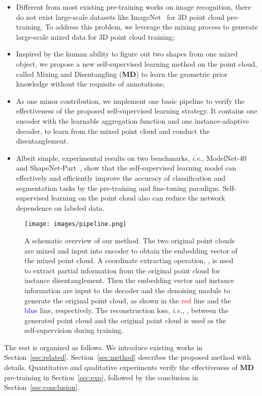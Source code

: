 \documentclass[journal]{IEEEtran}
\def\ie{\emph{i.e.}}
\begin{document}
\begin{itemize}
\item Different from most existing pre-training works on image recognition, there do not exist large-scale datasets like ImageNet~\cite{ILSVRC15} for 3D point cloud pre-training. To address this problem, we leverage the mixing process to generate large-scale mixed data for 3D point cloud training;

\item Inspired by the human ability to figure out two shapes from one mixed object, we propose a new self-supervised learning method on the point cloud, called Mixing and Disentangling (\textbf{MD}) to learn the geometric prior knowledge without the requisite of annotations;

\item As one minor contribution, we implement one basic pipeline to verify the effectiveness of the proposed self-supervised learning strategy. It contains one encoder with the learnable aggregation function and one instance-adaptive decoder, to learn from the mixed point cloud and conduct the disentanglement. 

\item Albeit simple, experimental results on two benchmarks, \ie, ModelNet-40~\cite{wu20153d} and ShapeNet-Part~\cite{yi2016scalable}, show that the self-supervised learning model can effectively and efficiently improve the accuracy of classification and segmentation tasks by the pre-training and fine-tuning paradigm. Self-supervised learning on the point cloud also can reduce the network dependence on labeled data. 

\end{itemize}

\begin{figure}[t]
\begin{center}
\texttt{[image: images/pipeline.png]}
\end{center}
\vspace{-.15in}
   \caption{A schematic overview of our method. The two original point clouds are mixed and input into encoder  to obtain the embedding vector of the mixed point cloud. A coordinate extracting operation, , is used to extract partial information from the original point cloud for instance disentanglement. Then the embedding vector and instance information are input to the decoder  and the denoising module to generate the original point cloud, as shown in the \textcolor{red}{red} line and the \textcolor{blue}{blue} line, respectively. 
   The reconstruction loss, \ie, , between the generated point cloud and the original point cloud is used as the self-supervision during training.}
\label{fig:overview}
\end{figure}
The rest is organized as follows. We introduce existing works in Section~\ref{sec:related}. Section~\ref{sec:method} describes the proposed method with details. Quantitative and qualitative experiments verify the effectiveness of \textbf{MD} pre-training in Section~\ref{sec:exp}, followed by the conclusion in Section~\ref{sec:conclusion}. 
\end{document}
